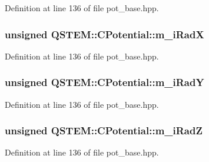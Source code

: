 Definition at line 136 of file pot\-\_\-base.\-hpp.

\hypertarget{class_q_s_t_e_m_1_1_c_potential_a9aadfa6b43b9dbeb2b98aa0c97dc5295}{
\subsubsection[{m\-\_\-i\-Rad\-X}]{\setlength{\rightskip}{0pt plus 5cm}unsigned Q\-S\-T\-E\-M\-::\-C\-Potential\-::m\-\_\-i\-Rad\-X\hspace{0.3cm}{\ttfamily [protected]}}}\label{class_q_s_t_e_m_1_1_c_potential_a9aadfa6b43b9dbeb2b98aa0c97dc5295}


Definition at line 136 of file pot\-\_\-base.\-hpp.

\hypertarget{class_q_s_t_e_m_1_1_c_potential_adbc5d4e1bbd67c44008d63970816213b}{
\subsubsection[{m\-\_\-i\-Rad\-Y}]{\setlength{\rightskip}{0pt plus 5cm}unsigned Q\-S\-T\-E\-M\-::\-C\-Potential\-::m\-\_\-i\-Rad\-Y\hspace{0.3cm}{\ttfamily [protected]}}}\label{class_q_s_t_e_m_1_1_c_potential_adbc5d4e1bbd67c44008d63970816213b}


Definition at line 136 of file pot\-\_\-base.\-hpp.

\hypertarget{class_q_s_t_e_m_1_1_c_potential_a29e42090bed12fa7867c8c9428bdc8d3}{
\subsubsection[{m\-\_\-i\-Rad\-Z}]{\setlength{\rightskip}{0pt plus 5cm}unsigned Q\-S\-T\-E\-M\-::\-C\-Potential\-::m\-\_\-i\-Rad\-Z\hspace{0.3cm}{\ttfamily [protected]}}}\label{class_q_s_t_e_m_1_1_c_potential_a29e42090bed12fa7867c8c9428bdc8d3}


Definition at line 136 of file pot\-\_\-base.\-hpp.

